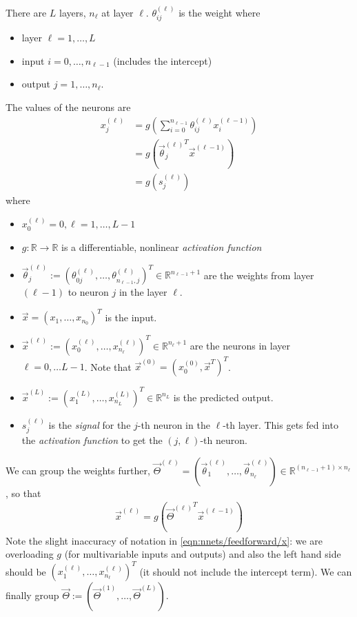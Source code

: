 There are $L$ layers, $n_{\ell}$ at layer $\ell$. $\theta_{ij}^{(\ell)}$ is the weight where
\begin{itemize}
    \item layer $\ell = 1, \dotsc, L$
    \item input $i = 0, \dotsc, n_{\ell - 1}$ (includes the intercept)
    \item output $j = 1, \dotsc, n_\ell$.
\end{itemize}
The values of the neurons are
\begin{align}
    x_j^{(\ell)}    &= g\left(\sum_{i = 0}^{n_{\ell - 1}} \theta_{ij}^{(\ell)} x_i^{(\ell - 1)}\right) \label{eqn:nnets/feedforward/x-small}\\
                    &= g\left({\vec \theta_j^{(\ell)}}^T \vec x^{(\ell - 1)}\right) \\
                    &= g\left(s_j^{(\ell)}\right)
\end{align}
where
\begin{itemize}
    \item $x_0^{(\ell)} = 0, \ell = 1, \dotsc, L - 1$
    \item $g: \mathbb R \to \mathbb R$ is a differentiable, nonlinear \emph{activation function}
    \item $\vec \theta_j^{(\ell)} := (\theta_{0j}^{(\ell)}, \dotsc, \theta_{n_{\ell - 1}, j}^{(\ell)})^T \in \mathbb R^{n_{\ell - 1} + 1}$ are the weights from layer $(\ell - 1)$ to neuron $j$ in the layer $\ell$.
    \item $\vec x = (x_1, \dotsc, x_{n_0})^T$ is the input.
    \item $\vec x^{(\ell)} := (x_0^{(\ell)}, \dotsc, x_{n_\ell}^{(\ell)})^T \in \mathbb R^{n_\ell + 1}$ are the neurons in layer $\ell = 0, \dotsc L - 1$. Note that $\vec x^{(0)} = \left(x_0^{(0)}, \vec x^T\right)^T$.
    \item $\vec x^{(L)} := (x_1^{(L)}, \dotsc, x_{n_L}^{(L)})^T \in \mathbb R^{n_L}$ is the predicted output.
    \item $s_j^{(\ell)}$ is the \emph{signal} for the $j$-th neuron in the $\ell$-th layer. This gets fed into the \emph{activation function} to get the $(j, \ell)$-th neuron.
\end{itemize}
We can group the weights further, $\vec \Theta^{(\ell)} = (\vec \theta_1^{(\ell)}, \dotsc, \vec \theta_{n_\ell}^{(\ell)}) \in \mathbb R^{(n_{\ell - 1} + 1) \times n_\ell}$, so that
\begin{align}
    \vec x^{(\ell)} = g\left({\vec \Theta^{(\ell)}}^T \vec x^{(\ell - 1)}\right) \label{eqn:nnets/feedforward/x}
\end{align}
Note the slight inaccuracy of notation in \eqref{eqn:nnets/feedforward/x}: we are overloading $g$ (for multivariable inputs and outputs) and also the left hand side should be $(x_1^{(\ell)}, \dotsc, x_{n_\ell}^{(\ell)})^T$ (it should not include the intercept term). We can finally group $\vec \Theta := (\vec \Theta^{(1)}, \dotsc, \vec \Theta^{(L)})$.

